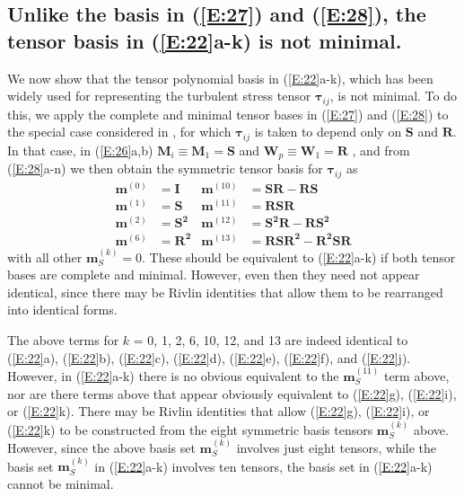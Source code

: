 \subsection{Unlike the basis in (\ref{E:27}) and (\ref{E:28}), the tensor basis in (\ref{E:22}a-k) is not minimal.}
\label{sec:2B}

We now show that the tensor polynomial basis in (\ref{E:22}a-k), which has been widely used for representing the turbulent stress tensor $\mathbf{\tau}_{ij}$, is not minimal. To do this, we apply the complete and minimal tensor bases in (\ref{E:27}) and (\ref{E:28}) to the special case considered in , for which $\mathbf{\tau}_{ij}$ is taken to depend only on $\mathbf{S}$ and $\mathbf{R}$.  In that case, in (\ref{E:26}a,b) $\mathbf{M}_i \equiv \mathbf{M}_1 = \mathbf{S}$ and $\mathbf{W}_p \equiv \mathbf{W}_1 = \mathbf{R}$ , and from (\ref{E:28}a-n) we then obtain the symmetric tensor basis for  $\mathbf{\tau}_{ij}$ as
%
\begin{align*}
\label{E:ASU8}
	\mathbf{m}^{(0)} &= \mathbf{I}    &  \mathbf{m}^{(10)}  &= \mathbf{SR}-\mathbf{RS}  \\ 
	\mathbf{m}^{(1)} &= \mathbf{S}    &  \mathbf{m}^{(11)}  &= \mathbf{RSR} \\
	\mathbf{m}^{(2)} &= \mathbf{S^2}  &  \mathbf{m}^{(12)}  &= \mathbf{S^2R}-\mathbf{RS^2}  \\
	\mathbf{m}^{(6)} &= \mathbf{R^2}  &  \mathbf{m}^{(13)}  &= \mathbf{RSR^2}-\mathbf{R^2SR} 
\end{align*}
%
%   	 
with all other $\mathbf{m}^{(k)}_S= 0$. These should be equivalent to (\ref{E:22}a-k) if both tensor bases are complete and minimal.  However, even then they need not appear identical, since there may be Rivlin identities that allow them to be rearranged into identical forms.

The above terms for $k$ = 0, 1, 2, 6, 10, 12, and 13 are indeed identical to (\ref{E:22}a), (\ref{E:22}b), (\ref{E:22}c), (\ref{E:22}d), (\ref{E:22}e), (\ref{E:22}f), and (\ref{E:22}j). However, in (\ref{E:22}a-k) there is no obvious equivalent to the $\mathbf{m}^{(11)}_S$  term above, nor are there terms above that appear obviously equivalent to (\ref{E:22}g), (\ref{E:22}i), or (\ref{E:22}k). There may be Rivlin identities that allow (\ref{E:22}g), (\ref{E:22}i), or (\ref{E:22}k) to be constructed from the eight symmetric basis tensors  $\mathbf{m}^{(k)}_S$ above. However, since the above basis set $\mathbf{m}^{(k)}_S$ involves just eight tensors, while the basis set  $\mathbf{m}^{(k)}_S$  in (\ref{E:22}a-k) involves ten tensors, the basis set in (\ref{E:22}a-k) cannot be minimal.

